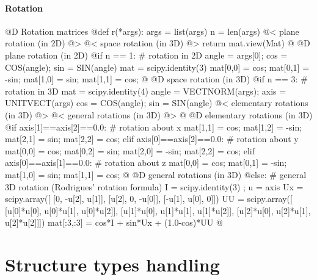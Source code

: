 \documentclass[11pt,oneside]{article}    %
\begin{document}
\paragraph{Rotation}
@D Rotation matrices
@{def r(*args): 
    args = list(args)
    n = len(args)
    @< plane rotation (in 2D) @>
    @< space rotation (in 3D) @>
    return mat.view(Mat)
@}
@D plane rotation (in 2D)
@{if n == 1: # rotation in 2D
    angle = args[0]; cos = COS(angle); sin = SIN(angle)
    mat = scipy.identity(3)
    mat[0,0] = cos;    mat[0,1] = -sin;
    mat[1,0] = sin;    mat[1,1] = cos;
@}
@D space rotation (in 3D)
@{if n == 3: # rotation in 3D
    mat = scipy.identity(4)
    angle = VECTNORM(args); axis = UNITVECT(args)
    cos = COS(angle); sin = SIN(angle)
    @< elementary rotations (in 3D) @>
    @< general rotations (in 3D) @>
@}
@D elementary rotations (in 3D)
@{if axis[1]==axis[2]==0.0:    # rotation about x
    mat[1,1] = cos;    mat[1,2] = -sin;
    mat[2,1] = sin;    mat[2,2] = cos;
elif axis[0]==axis[2]==0.0:    # rotation about y
    mat[0,0] = cos;    mat[0,2] = sin;
    mat[2,0] = -sin;    mat[2,2] = cos;
elif axis[0]==axis[1]==0.0:    # rotation about z
    mat[0,0] = cos;    mat[0,1] = -sin;
    mat[1,0] = sin;    mat[1,1] = cos;
@}
@D general rotations (in 3D)
@{else:        # general 3D rotation (Rodrigues' rotation formula)    
    I = scipy.identity(3) ; u = axis
    Ux = scipy.array([
        [0,        -u[2],      u[1]],
        [u[2],        0,     -u[0]],
        [-u[1],     u[0],         0]])
    UU = scipy.array([
        [u[0]*u[0],    u[0]*u[1],    u[0]*u[2]],
        [u[1]*u[0],    u[1]*u[1],    u[1]*u[2]],
        [u[2]*u[0],    u[2]*u[1],    u[2]*u[2]]])
    mat[:3,:3] = cos*I + sin*Ux + (1.0-cos)*UU
@}


\section{Structure types handling}
\end{document}
